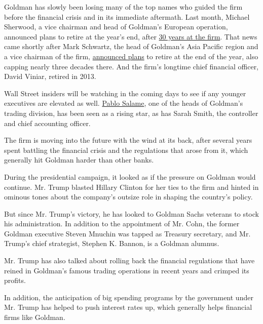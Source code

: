 Goldman has slowly been losing many of the top names who guided the firm
before the financial crisis and in its immediate aftermath. Last month,
Michael Sherwood, a vice chairman and head of Goldman's European
operation, announced plans to retire at the year's end, after
\href{https://www.nytimes.com/2016/11/21/business/dealbook/michael-sherwood-goldman-sachss-co-head-of-europe-to-step-down.html}{30
years at the firm}. That news came shortly after Mark Schwartz, the head
of Goldman's Asia Pacific region and a vice chairman of the firm,
\href{http://www.nytimes.com/2016/10/18/business/dealbook/goldman-sachss-asia-pacific-chairman-to-retire.html?rref=collection\%2Ftimestopic\%2FGoldman\%20Sachs\%20Group\&action=click\&contentCollection=business\&region=stream\&module=stream_unit\&version=latest\&contentPlacement=5\&pgtype=collection}{announced
plans} to retire at the end of the year, also capping nearly three
decades there. And the firm's longtime chief financial officer, David
Viniar, retired in 2013.

Wall Street insiders will be watching in the coming days to see if any
younger executives are elevated as well.
\href{http://www.goldmansachs.com/who-we-are/leadership/management-committee/pablo-j-salame.html}{Pablo
Salame}, one of the heads of Goldman's trading division, has been seen
as a rising star, as has Sarah Smith, the controller and chief
accounting officer.

The firm is moving into the future with the wind at its back, after
several years spent battling the financial crisis and the regulations
that arose from it, which generally hit Goldman harder than other banks.

During the presidential campaign, it looked as if the pressure on
Goldman would continue. Mr. Trump blasted Hillary Clinton for her ties
to the firm and hinted in ominous tones about the company's outsize role
in shaping the country's policy.

But since Mr. Trump's victory, he has looked to Goldman Sachs veterans
to stock his administration. In addition to the appointment of Mr. Cohn,
the former Goldman executive Steven Mnuchin was tapped as Treasury
secretary, and Mr. Trump's chief strategist, Stephen K. Bannon, is a
Goldman alumnus.

Mr. Trump has also talked about rolling back the financial regulations
that have reined in Goldman's famous trading operations in recent years
and crimped its profits.

In addition, the anticipation of big spending programs by the government
under Mr. Trump has helped to push interest rates up, which generally
helps financial firms like Goldman.


